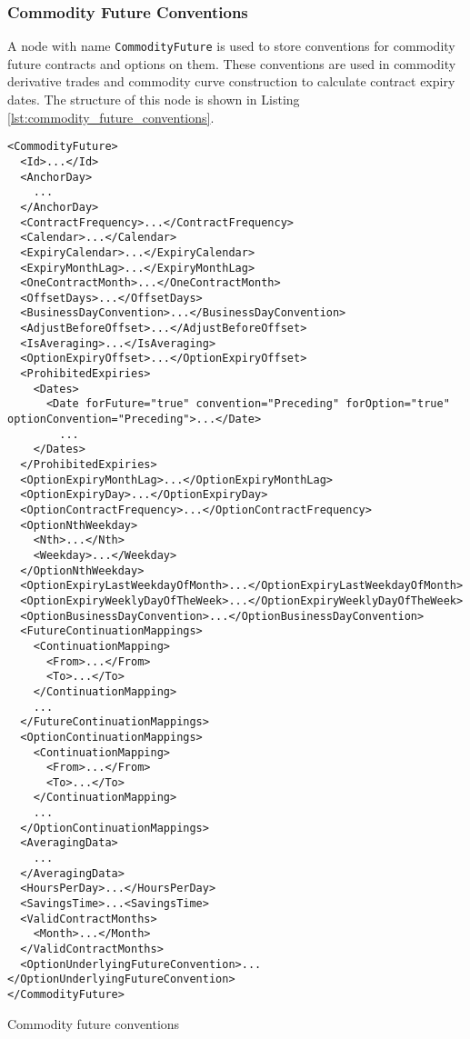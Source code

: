\subsubsection{Commodity Future Conventions}
\label{sec:commodity_future_conventions}
A node with name \lstinline!CommodityFuture! is used to store conventions for commodity future contracts and options on them. These conventions are used in commodity derivative trades and commodity curve construction to calculate contract expiry dates. The structure of this node is shown in Listing \ref{lst:commodity_future_conventions}.

\begin{listing}[h!]
\begin{verbatim}
<CommodityFuture>
  <Id>...</Id>
  <AnchorDay>
    ...
  </AnchorDay>
  <ContractFrequency>...</ContractFrequency>
  <Calendar>...</Calendar>
  <ExpiryCalendar>...</ExpiryCalendar>
  <ExpiryMonthLag>...</ExpiryMonthLag>
  <OneContractMonth>...</OneContractMonth>
  <OffsetDays>...</OffsetDays>
  <BusinessDayConvention>...</BusinessDayConvention>
  <AdjustBeforeOffset>...</AdjustBeforeOffset>
  <IsAveraging>...</IsAveraging>
  <OptionExpiryOffset>...</OptionExpiryOffset>
  <ProhibitedExpiries>
    <Dates>
      <Date forFuture="true" convention="Preceding" forOption="true" optionConvention="Preceding">...</Date>
        ...
    </Dates>
  </ProhibitedExpiries>
  <OptionExpiryMonthLag>...</OptionExpiryMonthLag>
  <OptionExpiryDay>...</OptionExpiryDay>
  <OptionContractFrequency>...</OptionContractFrequency>
  <OptionNthWeekday>
    <Nth>...</Nth>
    <Weekday>...</Weekday>
  </OptionNthWeekday>
  <OptionExpiryLastWeekdayOfMonth>...</OptionExpiryLastWeekdayOfMonth>
  <OptionExpiryWeeklyDayOfTheWeek>...</OptionExpiryWeeklyDayOfTheWeek>
  <OptionBusinessDayConvention>...</OptionBusinessDayConvention>
  <FutureContinuationMappings>
    <ContinuationMapping>
      <From>...</From>
      <To>...</To>
    </ContinuationMapping>
    ...
  </FutureContinuationMappings>
  <OptionContinuationMappings>
    <ContinuationMapping>
      <From>...</From>
      <To>...</To>
    </ContinuationMapping>
    ...
  </OptionContinuationMappings>
  <AveragingData>
    ...
  </AveragingData>
  <HoursPerDay>...</HoursPerDay>
  <SavingsTime>...<SavingsTime>
  <ValidContractMonths>
  	<Month>...</Month>
  </ValidContractMonths>
  <OptionUnderlyingFutureConvention>...</OptionUnderlyingFutureConvention>
</CommodityFuture>
\end{verbatim}
\caption{Commodity future conventions}
\label{lst:commodity_future_conventions}
\end{listing}

